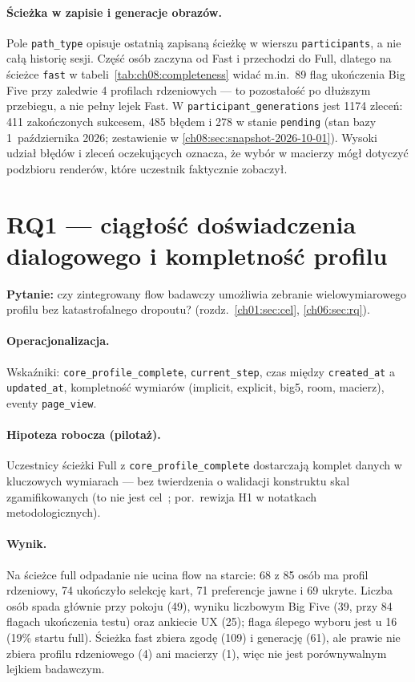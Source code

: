 \paragraph{Ścieżka w zapisie i generacje obrazów.}
Pole \texttt{path\_type} opisuje ostatnią zapisaną ścieżkę w wierszu \texttt{participants}, a nie całą historię sesji. Część osób zaczyna od Fast i przechodzi do Full, dlatego na ścieżce \texttt{fast} w tabeli~\ref{tab:ch08:completeness} widać m.in.\ 89 flag ukończenia Big Five przy zaledwie 4 profilach rdzeniowych --- to pozostałość po dłuższym przebiegu, a nie pełny lejek Fast. W \texttt{participant\_generations} jest 1174 zleceń: 411 zakończonych sukcesem, 485 błędem i 278 w stanie \texttt{pending} (stan bazy 1~października 2026; zestawienie w \cref{ch08:sec:snapshot-2026-10-01}). Wysoki udział błędów i zleceń oczekujących oznacza, że wybór w macierzy mógł dotyczyć podzbioru renderów, które uczestnik faktycznie zobaczył.

\section{RQ1 --- ciągłość doświadczenia dialogowego i kompletność profilu}
\label{ch08:sec:rq1}

\textbf{Pytanie:} czy zintegrowany flow badawczy umożliwia zebranie wielowymiarowego profilu bez katastrofalnego dropoutu? (rozdz.~\ref{ch01:sec:cel}, \ref{ch06:sec:rq}).

\paragraph{Operacjonalizacja.}
Wskaźniki: \texttt{core\_profile\_complete}, \texttt{current\_step}, czas między \texttt{created\_at} a \texttt{updated\_at}, kompletność wymiarów (implicit, explicit, big5, room, macierz), eventy \texttt{page\_view}.

\paragraph{Hipoteza robocza (pilotaż).}
Uczestnicy ścieżki Full z \texttt{core\_profile\_complete} dostarczają komplet danych w kluczowych wymiarach --- bez twierdzenia o walidacji konstruktu skal zgamifikowanych (to nie jest cel~; por.\ rewizja H1 w notatkach metodologicznych).

\paragraph{Wynik.}
Na ścieżce full odpadanie nie ucina flow na starcie: 68 z 85 osób ma profil rdzeniowy, 74 ukończyło selekcję kart, 71 preferencje jawne i 69 ukryte. Liczba osób spada głównie przy pokoju (49), wyniku liczbowym Big Five (39, przy 84 flagach ukończenia testu) oraz ankiecie UX (25); flaga ślepego wyboru jest u 16 (19\% startu full). Ścieżka fast zbiera zgodę (109) i generację (61), ale prawie nie zbiera profilu rdzeniowego (4) ani macierzy (1), więc nie jest porównywalnym lejkiem badawczym.

